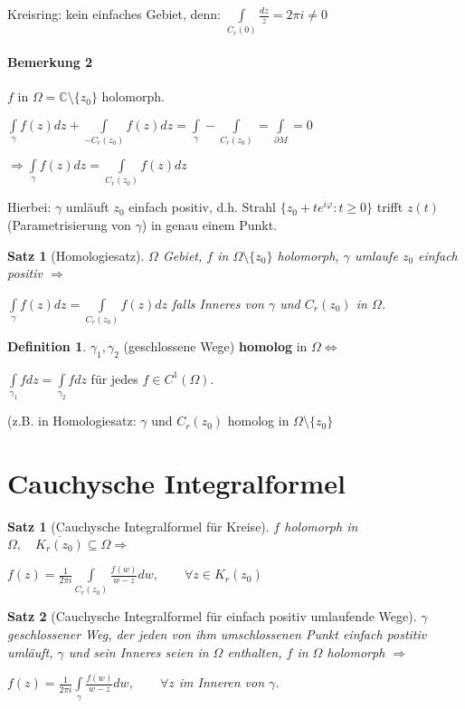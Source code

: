 \documentclass[ngerman,halfparskip]{scrartcl}
\newtheorem*{satz}{Satz}
\newtheorem*{satz*}{Satz}
\theoremstyle{definition}
\newtheorem*{defin}{Definition}
\def\C{\mathbb C}
\begin{document}
Kreisring: kein einfaches Gebiet, denn: $\int\limits_{C_r(0)}\frac{dz}z=2\pi i \neq 0$

\paragraph{Bemerkung 2} $f$ in $\Omega=\C \setminus \{z_0\}$ holomorph.

$\int\limits_\gamma f(z)dz +\int\limits_{-C_r(z_0)}f(z)dz=\int\limits_\gamma-\int\limits_{C_r(z_0)}=\int\limits_{\partial M}=0$

$\Rightarrow \boxed{\int\limits _\gamma f(z)dz=\int\limits_{C_r(z_0)}f(z)dz}$

Hierbei: $\gamma$ umläuft $z_0$ einfach positiv, d.h. Strahl $\{z_0+te^{i\varphi}: t\geq 0\}$ trifft $z(t)$ (Parametrisierung von $\gamma$) in genau einem Punkt.



\begin{satz*}[Homologiesatz]
$\Omega$ Gebiet, $f$ in $\Omega\setminus \{z_0\} $ holomorph, $\gamma$ umlaufe $z_0$ einfach positiv $\Rightarrow$

$\int\limits_\gamma f(z)dz =\int\limits_{C_r(z_0)}f(z)dz$ falls Inneres von $\gamma$ und $C_r(z_0)$ in $\Omega$.
\end{satz*}

\begin{defin}
$\gamma_1,\gamma_2$ (geschlossene Wege) \textbf{homolog} in $\Omega \Leftrightarrow$

$\int\limits_{\gamma_1}fdz=\int\limits_{\gamma_2}fdz$ für jedes $f\in C^1(\Omega)$.

(z.B. in Homologiesatz: $\gamma$ und $C_r(z_0)$ homolog in $\Omega\setminus\{z_0\}$
\end{defin}

\section{Cauchysche Integralformel}
\begin{satz}[Cauchysche Integralformel für Kreise]
$f$ holomorph in $\Omega,\quad \overline{K_r(z_0)}\subseteq\Omega \Rightarrow$

$f(z)=\frac 1{2\pi i } \int \limits _{C_r(z_0)}\frac {f(w)}{w-z}dw, \qquad \forall z\in K_r(z_0)$
\end{satz}

\begin{satz}[Cauchysche Integralformel für einfach positiv umlaufende Wege] 
$\gamma$ geschlossener Weg, der jeden von ihm umschlossenen Punkt einfach postitiv umläuft, $\gamma$ und sein Inneres seien in $\Omega$ enthalten, $f$ in $\Omega$ holomorph $\Rightarrow$

$f(z)=\frac 1 {2\pi i} \int\limits_\gamma \frac {f(w)}{w-z}dw, \qquad \forall z$ im Inneren von $\gamma$.
 
\end{satz}
\end{document}
